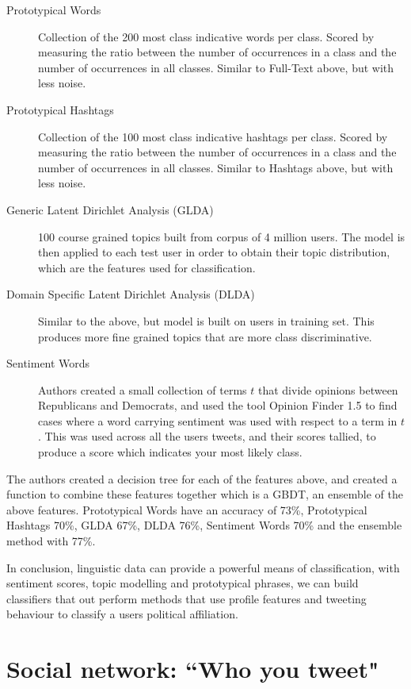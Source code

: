 \documentclass[bsc,frontabs,singlespacing,parskip]{infthesis}     %
\begin{document}
\begin{description}
\item[Prototypical Words] Collection of the 200 most class indicative words per class. Scored by measuring the ratio between the number of occurrences in a class and the number of occurrences in all classes. Similar to Full-Text above, but with less noise.
\item[Prototypical Hashtags] Collection of the 100 most class indicative hashtags per class. Scored by measuring the ratio between the number of occurrences in a class  and the number of occurrences in all classes. Similar to Hashtags above, but with less noise.
\item[Generic Latent Dirichlet Analysis (GLDA)] 100 course grained topics built from corpus of 4 million users. The model is then applied to each test user in order to obtain their topic distribution, which are the features used for classification.
\item[Domain Specific Latent Dirichlet Analysis (DLDA)] Similar to the above, but model is built on users in training set. This produces more fine grained topics that are more class discriminative. 
\item[Sentiment Words] Authors created a small collection of terms $t$ that divide opinions between Republicans and Democrats, and used the tool Opinion Finder 1.5 to find cases where a word carrying sentiment was used with respect to a term in $t$. This was used across all the users tweets, and their scores tallied, to produce a score which indicates your most likely class. 
\end{description}

The authors created a decision tree for each of the features above, and created a function to combine these features together which is a GBDT, an ensemble of the above features. Prototypical Words have an accuracy of 73\%, Prototypical Hashtags 70\%, GLDA 67\%, DLDA 76\%, Sentiment Words 70\% and the ensemble method  with 77\%. 

In conclusion, linguistic data can provide a powerful means of classification, with sentiment scores, topic modelling and prototypical phrases, we can build classifiers that out perform methods that use profile features and tweeting behaviour to classify a users political affiliation. 

\section{Social network: ``Who you tweet"}
\label{sec:socnet}
\end{document}
